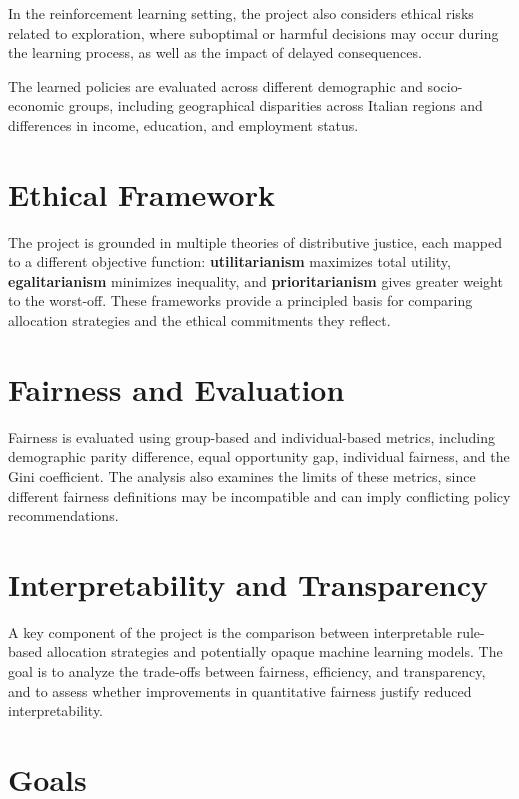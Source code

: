 \documentclass[11pt]{article}
\begin{document}
In the reinforcement learning setting, the project also considers ethical risks related to exploration, where suboptimal or harmful decisions may occur during the learning process, as well as the impact of delayed consequences.

The learned policies are evaluated across different demographic and socio-economic groups, including geographical disparities across Italian regions and differences in income, education, and employment status.

\section{Ethical Framework}

The project is grounded in multiple theories of distributive justice, each mapped to a different objective function: \textbf{utilitarianism} maximizes total utility, \textbf{egalitarianism} minimizes inequality, and \textbf{prioritarianism} gives greater weight to the worst-off. These frameworks provide a principled basis for comparing allocation strategies and the ethical commitments they reflect.

\section{Fairness and Evaluation}

Fairness is evaluated using group-based and individual-based metrics, including demographic parity difference, equal opportunity gap, individual fairness, and the Gini coefficient. The analysis also examines the limits of these metrics, since different fairness definitions may be incompatible and can imply conflicting policy recommendations.

\section{Interpretability and Transparency}

A key component of the project is the comparison between interpretable rule-based allocation strategies and potentially opaque machine learning models. The goal is to analyze the trade-offs between fairness, efficiency, and transparency, and to assess whether improvements in quantitative fairness justify reduced interpretability.

\section{Goals}
\end{document}
